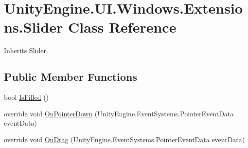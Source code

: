 \hypertarget{class_unity_engine_1_1_u_i_1_1_windows_1_1_extensions_1_1_slider}{}\section{Unity\+Engine.\+U\+I.\+Windows.\+Extensions.\+Slider Class Reference}
\label{class_unity_engine_1_1_u_i_1_1_windows_1_1_extensions_1_1_slider}


Inherits Slider.

\subsection*{Public Member Functions}
\begin{DoxyCompactItemize}
\item 
bool \hyperlink{class_unity_engine_1_1_u_i_1_1_windows_1_1_extensions_1_1_slider_ab095bd64c50ee11964a559a0974fe3ac}{Is\+Filled} ()
\item 
override void \hyperlink{class_unity_engine_1_1_u_i_1_1_windows_1_1_extensions_1_1_slider_aaceecc8748b01bfe8817897029a8c4f3}{On\+Pointer\+Down} (Unity\+Engine.\+Event\+Systems.\+Pointer\+Event\+Data event\+Data)
\item 
override void \hyperlink{class_unity_engine_1_1_u_i_1_1_windows_1_1_extensions_1_1_slider_a1c67d7ae393305c749a592401d1114db}{On\+Drag} (Unity\+Engine.\+Event\+Systems.\+Pointer\+Event\+Data event\+Data)
\end{DoxyCompactItemize}
